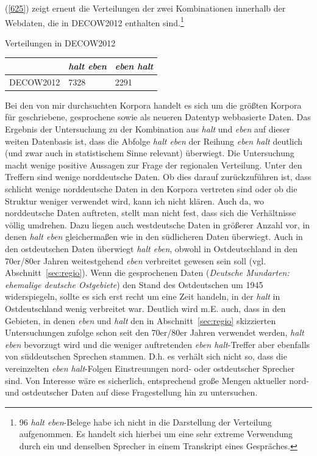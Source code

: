 (\ref{625}) zeigt erneut die Verteilungen der zwei Kombinationen innerhalb der Webdaten, die in DECOW2012 enthalten sind.\footnote{96 \textit{halt eben}-Belege habe ich nicht in die Darstellung der Verteilung aufgenommen. Es handelt sich hierbei um eine sehr extreme Verwendung durch ein und denselben Sprecher in einem Transkript eines Gespräches.}

\begin{exe}
	\ex\label{625} Verteilungen in DECOW2012\\[-1em]
     \begin{tabular}[t]{|l|l|l|}
     \hline
     & \textit{halt eben} & \textit{eben halt}\\
     \hline
     DECOW2012 & 7328 & 2291\\
     \hline
     \end{tabular}
\end{exe}
Bei den von mir durchsuchten Korpora handelt es sich um die größten Korpora für geschriebene, gesprochene sowie als neueren Datentyp webbasierte Daten. Das Ergebnis der Untersuchung zu der Kombination aus \textit{halt} und \textit{eben} auf dieser weiten Datenbasis ist, dass die Abfolge \textit{halt eben} der Reihung \textit{eben halt} deutlich (und zwar auch in statistischem Sinne relevant) überwiegt. Die Untersuchung macht wenige positive Aussagen zur Frage der regionalen Verteilung. Unter den Treffern sind wenige norddeutsche Daten. Ob dies darauf zurückzuführen ist, dass schlicht wenige norddeutsche Daten in den Korpora vertreten sind oder ob die Struktur weniger verwendet wird, kann ich nicht klären. Auch da, wo norddeutsche Daten auftreten, stellt man nicht fest, dass sich die Verhältnisse völlig umdrehen. Dazu liegen auch westdeutsche Daten in größerer Anzahl vor, in denen \textit{halt eben} gleichermaßen wie in den südlicheren Daten überwiegt. Auch in den ostdeutschen Daten überwiegt \textit{halt eben}, obwohl in Ostdeutschland in den 70er/80er Jahren weitestgehend \textit{eben} verbreitet gewesen sein soll (vgl. Abschnitt~\ref{sec:regio}). Wenn die gesprochenen Daten (\textit{Deutsche Mundarten: ehemalige deutsche Ostgebiete}) den Stand des Ostdeutschen um 1945 widerspiegeln, sollte es sich erst recht um eine Zeit handeln, in der \textit{halt} in Ostdeutschland wenig verbreitet war. Deutlich wird m.E. auch, dass in den Gebieten, in denen \textit{eben} und \textit{halt} den in Abschnitt~\ref{sec:regio} skizzierten Untersuchungen zufolge schon seit den 70er/80er Jahren verwendet werden, \textit{halt eben} bevorzugt wird und die weniger auftretenden \textit{eben halt}-Treffer aber ebenfalls von süddeutschen Sprechen stammen. D.h. es verhält sich nicht so, dass die vereinzelten \textit{eben halt}-Folgen Einstreuungen nord- oder ostdeutscher Sprecher sind. Von Interesse wäre es sicherlich, entsprechend große Mengen aktueller nord- und ostdeutscher Daten auf diese Fragestellung hin zu untersuchen. 

